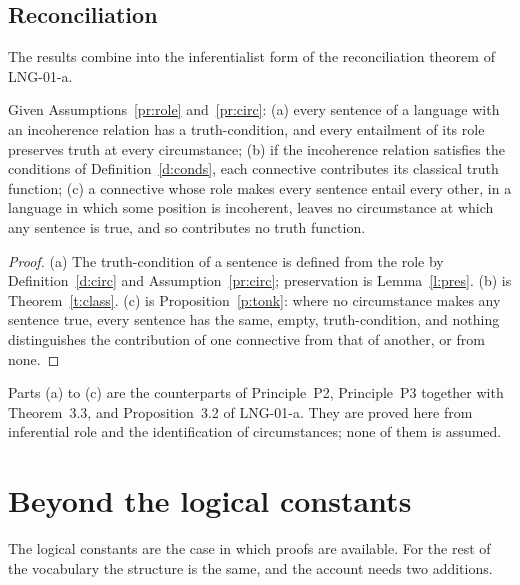 \documentclass{situationist-preprint}
\begin{document}
\subsection{Reconciliation}

The results combine into the inferentialist form of the reconciliation theorem of LNG-01-a.

\begin{theorem}\label{t:recon}
Given Assumptions~\ref{pr:role} and~\ref{pr:circ}: (a) every sentence of a language with an incoherence relation has a truth-condition, and every entailment of its role preserves truth at every circumstance; (b) if the incoherence relation satisfies the conditions of Definition~\ref{d:conds}, each connective contributes its classical truth function; (c) a connective whose role makes every sentence entail every other, in a language in which some position is incoherent, leaves no circumstance at which any sentence is true, and so contributes no truth function.
\end{theorem}

\begin{proof}
(a) The truth-condition of a sentence is defined from the role by Definition~\ref{d:circ} and Assumption~\ref{pr:circ}; preservation is Lemma~\ref{l:pres}. (b) is Theorem~\ref{t:class}. (c) is Proposition~\ref{p:tonk}: where no circumstance makes any sentence true, every sentence has the same, empty, truth-condition, and nothing distinguishes the contribution of one connective from that of another, or from none.
\end{proof}

Parts (a) to (c) are the counterparts of Principle~P2, Principle~P3 together with Theorem~3.3, and Proposition~3.2 of LNG-01-a. They are proved here from inferential role and the identification of circumstances; none of them is assumed.

\section{Beyond the logical constants}\label{s:beyond}

The logical constants are the case in which proofs are available. For the rest of the vocabulary the structure is the same, and the account needs two additions.
\end{document}
